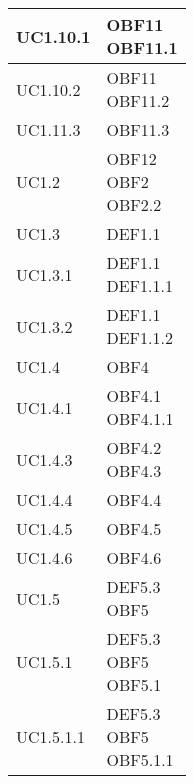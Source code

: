 \documentclass{scalatekids-article}
\begin{document}
\begin{longtable}[H]{|p{5.5cm}|p{5.5cm}|}
  \hline
  UC1.10.1 & \multiLineCell[t]{OBF11\\OBF11.1\\}\\
  \hline
  UC1.10.2 & \multiLineCell[t]{OBF11\\OBF11.2\\}\\
  \hline
  UC1.11.3 & \multiLineCell[t]{OBF11.3\\}\\
  \hline
  UC1.2 & \multiLineCell[t]{OBF12\\OBF2\\OBF2.2\\}\\
  \hline
  UC1.3 & \multiLineCell[t]{DEF1.1\\}\\
  \hline
  UC1.3.1 & \multiLineCell[t]{DEF1.1\\DEF1.1.1\\}\\
  \hline
  UC1.3.2 & \multiLineCell[t]{DEF1.1\\DEF1.1.2\\}\\
  \hline
  UC1.4 & \multiLineCell[t]{OBF4\\}\\
  \hline
  UC1.4.1 & \multiLineCell[t]{OBF4.1\\OBF4.1.1\\}\\
  \hline
  UC1.4.3 & \multiLineCell[t]{OBF4.2\\OBF4.3\\}\\
  \hline
  UC1.4.4 & \multiLineCell[t]{OBF4.4\\}\\
  \hline
  UC1.4.5 & \multiLineCell[t]{OBF4.5\\}\\
  \hline
  UC1.4.6 & \multiLineCell[t]{OBF4.6\\}\\
  \hline
  UC1.5 & \multiLineCell[t]{DEF5.3\\OBF5\\}\\
  \hline
  UC1.5.1 & \multiLineCell[t]{DEF5.3\\OBF5\\OBF5.1\\}\\
  \hline
  UC1.5.1.1 & \multiLineCell[t]{DEF5.3\\OBF5\\OBF5.1.1\\}\\

\end{longtable}
\end{document}
